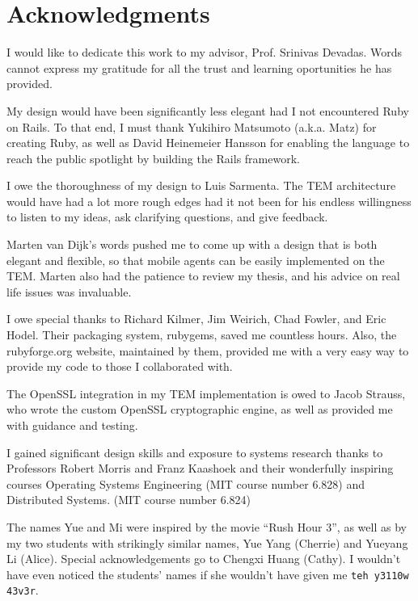 \section*{Acknowledgments}

I would like to dedicate this work to my advisor, Prof. Srinivas Devadas. Words
cannot express my gratitude for all the trust and learning oportunities he has
provided.

My design would have been significantly less elegant had I not encountered Ruby
on Rails. To that end, I must thank Yukihiro Matsumoto (a.k.a. Matz) for
creating Ruby, as well as David Heinemeier Hansson for enabling the language to
reach the public spotlight by building the Rails framework.

I owe the thoroughness of my design to Luis Sarmenta. The TEM architecture
would have had a lot more rough edges had it not been for his endless
willingness to listen to my ideas, ask clarifying questions, and give feedback.

Marten van Dijk's words pushed me to come up with a design that is both elegant
and flexible, so that mobile agents can be easily implemented on the TEM. Marten
also had the patience to review my thesis, and his advice on real life issues was
invaluable.

I owe special thanks to Richard Kilmer, Jim Weirich, Chad Fowler, and Eric
Hodel. Their packaging system, rubygems, saved me countless hours. Also, the
rubyforge.org website, maintained by them, provided me with a very easy way to
provide my code to those I collaborated with.

The OpenSSL integration in my TEM implementation is owed to Jacob Strauss, who
wrote the custom OpenSSL cryptographic engine, as well as provided me with
guidance and testing.

I gained significant design skills and exposure to systems research thanks to
Professors Robert Morris and Franz Kaashoek and their wonderfully inspiring
courses Operating Systems Engineering (MIT course number 6.828) and Distributed
Systems. (MIT course number 6.824)

The names Yue and Mi were inspired by the movie ``Rush Hour 3'',
as well as by my two students with strikingly similar names, Yue Yang (Cherrie)
and Yueyang Li (Alice). Special acknowledgements go to Chengxi Huang (Cathy).
I wouldn't have even noticed the students' names if she wouldn't have given
me \texttt{teh y3110w 43v3r}.
